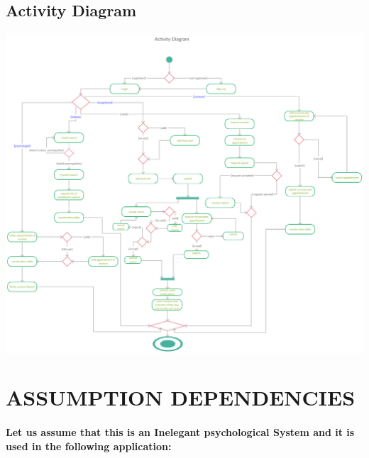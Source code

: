 \documentclass[../Psychological_system_web_application.tex]{subfiles}
\begin{document}
					\subsection{Activity Diagram}
					\includegraphics[width=\textwidth ,height=0.9\textheight ,scale=4]{Diagrams/Activity_Of_Psychological_System.pdf}	
					
		\section{ASSUMPTION DEPENDENCIES}
			\paragraph{Let us assume that this is an Inelegant psychological System and it is used in the following application:}
\end{document}
